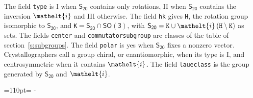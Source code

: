 \documentclass[10pt,a4paper]{article}
\makeatletter
\def\grouprule#1#2{\noalign{\marks\LTgroupmarks{\the\belowrulesep}\nobreak\vskip#1%
  \vskip\aboverulesep}\multispan\LT@cols\unskip{\leaders\hrule\@height#2\hfill\kern\z@}\cr
  \noalign{\penalty\LTrulebreak\vskip\belowrulesep\global\@lastruleclass\z@}}
\newcommand{\needspace}[1]{\par\penalty-100\begingroup\dimen0=#1\relax\dimen2=\pagegoal
  \advance\dimen2-\pagetotal\ifdim\dimen0>\dimen2\relax\ifdim\dimen2>0pt\vfil\break\fi\fi
  \endgroup}
\numberwithin{equation}{section}
\newcommand{\eltfont}[1]{{\let\sigma\eltsigma\mathelt{#1}}}
\newcommand{\grp}[1]{\mathsf{#1}}
\newcommand{\elt}[1]{\eltfont{#1}}
\newcommand{\hmname}[1]{#1}
\newcommand{\orbname}[1]{#1}
\newcommand{\conwayname}[1]{#1}
\newcommand{\igname}[1]{#1}
\newcommand{\olivename}[1]{#1}
\makeatother
\begin{document}
{}
\leavevmode\label{n:element.inversion}The field \texttt{type} is I when $\grp{S_{20}}$ contains only rotations, II when $\grp{S_{20}}$ contains the inversion $\elt{i}$ and III otherwise. The field \texttt{hk} gives \texttt{H}, the rotation group isomorphic to $\grp{S_{20}}$, and \texttt{K}${} = \grp{S_{20}} \cap \grp{SO(3)}$, with $\grp{S_{20}} = \texttt{K} \cup \elt{i}\,(\texttt{H} \setminus \texttt{K})$ as sets. The fields \texttt{center} and \texttt{commutatorsubgroup} are classes of the table of section~\ref{s:subgroups}. The field \texttt{polar} is yes when $\grp{S_{20}}$ fixes a nonzero vector. Crystallographers call a group chiral, or enantiomorphic, when its type is I, and centrosymmetric when it contains $\elt{i}$. The field \texttt{laueclass} is the group generated by $\grp{S_{20}}$ and $\elt{i}$.
\needspace{110pt}
\end{document}
